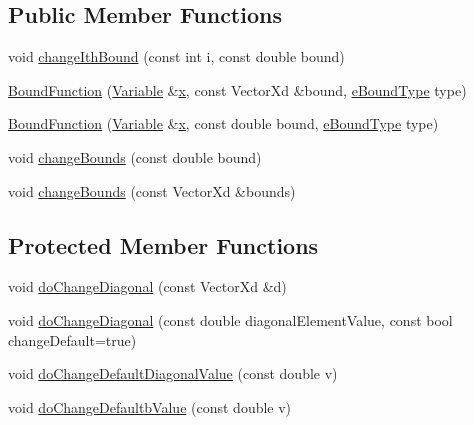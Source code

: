 \subsection*{Public Member Functions}
\begin{DoxyCompactItemize}
\item 
void \hyperlink{classocra_1_1BoundFunction_ad9a5cb9442e2129111d189e8063304ad}{change\+Ith\+Bound} (const int i, const double bound)
\end{DoxyCompactItemize}
{\bf }\par
\begin{DoxyCompactItemize}
\item 
\hyperlink{classocra_1_1BoundFunction_a7dc079453fdb607b46295246153481fd}{Bound\+Function} (\hyperlink{classocra_1_1Variable}{Variable} \&\hyperlink{classocra_1_1Function_a28825886d1f149c87b112ec2ec1dd486}{x}, const Vector\+Xd \&bound, \hyperlink{namespaceocra_ab3efdc117d9e5bcb0192640f5e7dc79b}{e\+Bound\+Type} type)
\item 
\hyperlink{classocra_1_1BoundFunction_afba908c0284f8ce9b2f7f1f8e5338cb5}{Bound\+Function} (\hyperlink{classocra_1_1Variable}{Variable} \&\hyperlink{classocra_1_1Function_a28825886d1f149c87b112ec2ec1dd486}{x}, const double bound, \hyperlink{namespaceocra_ab3efdc117d9e5bcb0192640f5e7dc79b}{e\+Bound\+Type} type)
\end{DoxyCompactItemize}

{\bf }\par
\begin{DoxyCompactItemize}
\item 
void \hyperlink{classocra_1_1BoundFunction_a205a73bb12f3255368d125ba0a6b4e58}{change\+Bounds} (const double bound)
\item 
void \hyperlink{classocra_1_1BoundFunction_aa69f4a52a46914e6ecbffb525e7d1314}{change\+Bounds} (const Vector\+Xd \&bounds)
\end{DoxyCompactItemize}

\subsection*{Protected Member Functions}
{\bf }\par
\begin{DoxyCompactItemize}
\item 
void \hyperlink{classocra_1_1BoundFunction_a95e8e97598f5ca779b9c171c56a7342a}{do\+Change\+Diagonal} (const Vector\+Xd \&d)
\item 
void \hyperlink{classocra_1_1BoundFunction_ac1a1b78b8b1796543b4c83ae5d8de755}{do\+Change\+Diagonal} (const double diagonal\+Element\+Value, const bool change\+Default=true)
\item 
void \hyperlink{classocra_1_1BoundFunction_af02c8fc499fb37596c758861d98cfbf6}{do\+Change\+Default\+Diagonal\+Value} (const double v)
\item 
void \hyperlink{classocra_1_1BoundFunction_aa861028f4a37e45b4fc68b7852d7e451}{do\+Change\+Defaultb\+Value} (const double v)
\end{DoxyCompactItemize}

